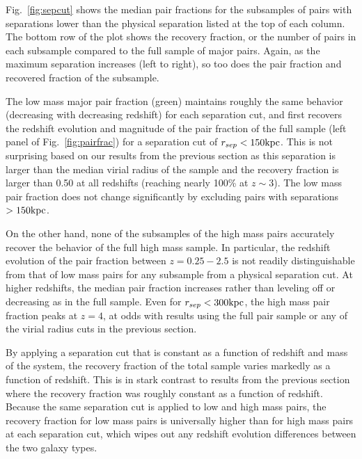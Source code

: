 \documentclass[twocolumn]{aastex631}
\begin{document}
    Fig.~\ref{fig:sepcut} shows the median pair fractions for the subsamples of pairs with separations lower than the physical separation listed at the top of each column. 
    The bottom row of the plot shows the recovery fraction, or the number of pairs in each subsample compared to the full sample of major pairs. 
    Again, as the maximum separation increases (left to right), so too does the pair fraction and recovered fraction of the subsample. 
    
    The low mass major pair fraction (green) maintains roughly the same behavior (decreasing with decreasing redshift) for each separation cut, and first recovers the redshift evolution and magnitude of the pair fraction of the full sample (left panel of Fig.~\ref{fig:pairfrac}) for a separation cut of $r_{sep} < 150\mathrm{kpc}$. 
    This is not surprising based on our results from the previous section as this separation is larger than the median virial radius of the sample and the recovery fraction is larger than 0.50 at all redshifts (reaching nearly 100\% at $z\sim3$).  
    The low mass pair fraction does not change significantly by excluding pairs with separations $>150\mathrm{kpc}$.

    On the other hand, none of the subsamples of the high mass pairs accurately recover the behavior of the full high mass sample. 
    In particular, the redshift evolution of the pair fraction between $z=0.25-2.5$ is not readily distinguishable from that of low mass pairs for any subsample from a physical separation cut.
    At higher redshifts, the median pair fraction increases rather than leveling off or decreasing as in the full sample.
    Even for $r_{sep}<300\mathrm{kpc}$, the high mass pair fraction peaks at $z=4$, at odds with results using the full pair sample or any of the virial radius cuts in the previous section. 

    By applying a separation cut that is constant as a function of redshift and mass of the system, the recovery fraction of the total sample varies markedly as a function of redshift.  
    This is in stark contrast to results from the previous section where the recovery fraction was roughly constant as a function of redshift.
    Because the same separation cut is applied to low and high mass pairs, the recovery fraction for low mass pairs is universally higher than for high mass pairs at each separation cut, which wipes out any redshift evolution differences between the two galaxy types.
    
    
\end{document}
